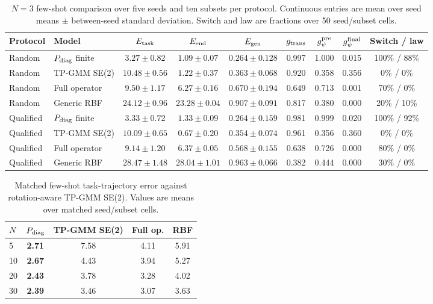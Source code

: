 \documentclass[letterpaper,10pt,conference]{ieeeconf}
\begin{document}
\begin{table}[t]
\centering
\caption{$N=3$ few-shot comparison over five seeds and ten subsets per
protocol. Continuous entries are mean over seed means $\pm$ between-seed
standard deviation. Switch and law are fractions over 50 seed/subset cells.}
\label{tab:fewshot_n3}
\scriptsize
\setlength{\tabcolsep}{3.0pt}
\begin{tabular}{llccccccc}
\toprule
Protocol & Model & $E_{\rm task}$ & $E_{\rm end}$ & $E_{\rm gen}$ &
$g_{\rm trans}$ & $g_\psi^{\rm pre}$ & $g_\psi^{\rm final}$ &
Switch / law\\
\midrule
Random & $P_{\rm diag}$ finite & $3.27{\pm}0.82$ & $1.09{\pm}0.07$ &
$0.264{\pm}0.128$ & 0.997 & 1.000 & 0.015 & 100\% / 88\%\\
Random & TP-GMM SE(2) & $10.48{\pm}0.56$ & $1.22{\pm}0.37$ &
$0.363{\pm}0.068$ & 0.920 & 0.358 & 0.356 & 0\% / 0\%\\
Random & Full operator & $9.50{\pm}1.17$ & $6.27{\pm}0.16$ &
$0.670{\pm}0.194$ & 0.649 & 0.713 & 0.001 & 70\% / 0\%\\
Random & Generic RBF & $24.12{\pm}0.96$ & $23.28{\pm}0.04$ &
$0.907{\pm}0.091$ & 0.817 & 0.380 & 0.000 & 20\% / 10\%\\
\midrule
Qualified & $P_{\rm diag}$ finite & $3.33{\pm}0.72$ & $1.33{\pm}0.09$ &
$0.264{\pm}0.159$ & 0.981 & 0.999 & 0.020 & 100\% / 92\%\\
Qualified & TP-GMM SE(2) & $10.09{\pm}0.65$ & $0.67{\pm}0.20$ &
$0.354{\pm}0.074$ & 0.961 & 0.356 & 0.360 & 0\% / 0\%\\
Qualified & Full operator & $9.14{\pm}1.20$ & $6.37{\pm}0.05$ &
$0.568{\pm}0.155$ & 0.638 & 0.726 & 0.000 & 80\% / 0\%\\
Qualified & Generic RBF & $28.47{\pm}1.48$ & $28.04{\pm}1.01$ &
$0.963{\pm}0.066$ & 0.382 & 0.444 & 0.000 & 30\% / 0\%\\
\bottomrule
\end{tabular}
\end{table}

\begin{table}[t]
\centering
\caption{Matched few-shot task-trajectory error against rotation-aware
TP-GMM SE(2). Values are means over matched seed/subset cells.}
\label{tab:fewshot_tpgmm}
\small
\setlength{\tabcolsep}{4.2pt}
\begin{tabular}{lcccc}
\toprule
$N$ & $P_{\rm diag}$ & TP-GMM SE(2) & Full op. & RBF\\
\midrule
5 & \textbf{2.71} & 7.58 & 4.11 & 5.91\\
10 & \textbf{2.67} & 4.43 & 3.94 & 5.27\\
20 & \textbf{2.43} & 3.78 & 3.28 & 4.02\\
30 & \textbf{2.39} & 3.46 & 3.07 & 3.63\\
\bottomrule
\end{tabular}
\end{table}
\end{document}
